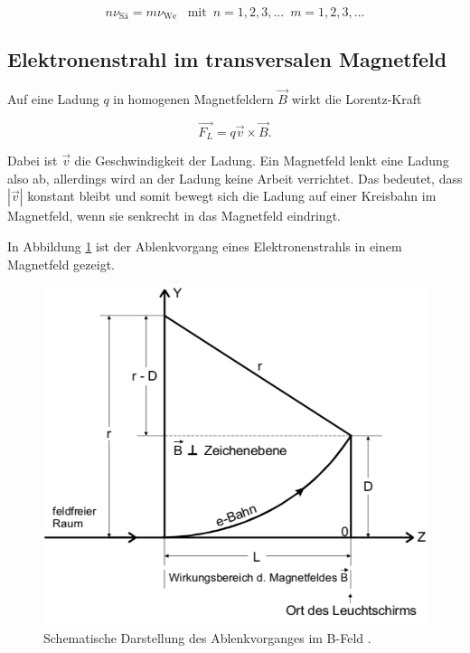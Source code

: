 \begin{equation}
  n \nu_\text{Sä} = m \nu_\text{We} \,\,\,\,\, \text{mit} \, \, \, n=1, 2, 3, ... \, \, \, m=1, 2, 3, ...
  \label{eq:2}
\end{equation}


\subsection{Elektronenstrahl im transversalen Magnetfeld}

Auf eine Ladung $q$ in homogenen Magnetfeldern $\vec{B}$ wirkt die Lorentz-Kraft

\begin{equation*}
  \vec{F_L} = q \vec{v} \times \vec{B}.
\end{equation*}

Dabei ist $\vec{v}$ die Geschwindigkeit der Ladung. Ein Magnetfeld lenkt eine Ladung
also ab, allerdings wird an der Ladung keine Arbeit verrichtet. Das bedeutet, dass
$|\vec{v}|$ konstant bleibt und somit bewegt sich die Ladung auf einer Kreisbahn im Magnetfeld,
wenn sie senkrecht in das Magnetfeld eindringt.

In Abbildung \ref{bild:1} ist der Ablenkvorgang eines Elektronenstrahls in einem
Magnetfeld gezeigt.

\begin{figure}[H]
  \centering
  \includegraphics[width=\textwidth]{content/B-Feld.png}
  \caption{Schematische Darstellung des Ablenkvorganges im B-Feld \cite{2}.}
  \label{bild:1}
\end{figure}



